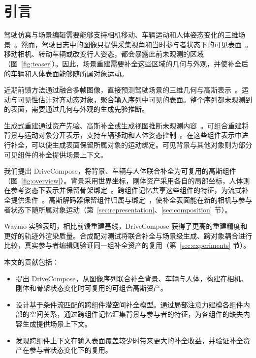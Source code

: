 \section{引言}
\label{sec:introduction}

驾驶仿真与场景编辑需要能够支持相机移动、车辆运动和人体姿态变化的三维场景~\cite{yang2023unisim,zhou2024hugsim}。然而，驾驶日志中的图像只提供采集视角和当时参与者状态下的可见表面~\cite{sun2020waymo,caesar2020nuscenes}。移动相机、转动车辆或改变行人姿态，都会暴露此前未观测的区域（图~\ref{fig:teaser}）。因此，场景重建需要补全这些区域的几何与外观，并使补全后的车辆和人体表面能够随所属对象运动。

近期前馈方法通过融合多帧图像，直接预测驾驶场景的三维几何与高斯表示~\cite{yang2025storm,chen2025dggt,yu2026streetforward,chi2026pointforward}。运动与可见性估计对齐动态对象，聚合输入序列中可见的表面。整个序列都未观测到的表面，需要通过几何与外观的生成先验推断。

生成式重建通过资产先验、高斯补全或生成视图推断未观测内容~\cite{yang2025genassets,liao2025complete,streetcrafter,zhu2025worldsplat}。可组合重建将背景与运动对象分开表示，支持车辆移动和人体姿态控制~\cite{yan2024street,chen2025omnire,zhou2024hugsim}。在这些组件表示中进行补全，可以使生成表面保留所属对象的运动绑定。可见背景与其他对象则为部分可见组件的补全提供场景上下文。

我们提出 DriveCompose，将背景、车辆与人体联合补全为可复用的高斯组件（图~\ref{fig:overview}）。背景采用世界坐标，刚体资产采用各自的局部坐标，人体则在参考姿态下表示并保留骨架绑定~\cite{yan2024street,chen2025omnire}。跨组件记忆共享这些组件的特征，为流式补全提供条件~\cite{lipman2022flowmatching}。高斯解码器保留组件归属与绑定~\cite{kerbl2023gaussians}，使补全表面能在新的相机与参与者状态下随所属对象运动（第~\ref{sec:representation}、\ref{sec:composition} 节）。

Waymo 实验表明，相比前馈重建基线，DriveCompose 获得了更高的重建精度和更好的轨迹外渲染质量。合成配对测试将联合补全与场景级生成、跨对象耦合进行比较，真实参与者编辑则验证同一组补全资产的复用（第~\ref{sec:experiments} 节）。

本文的贡献包括：
\begin{itemize}
\item 提出 DriveCompose，从图像序列联合补全背景、车辆与人体，构建在相机、刚体和骨架状态变化时可复用的可组合高斯资产。
\item 设计基于条件流匹配的跨组件潜空间补全模型。通过局部注意力建模各组件内部的空间关系，通过跨组件记忆汇集背景与参与者的特征，为各组件的缺失内容生成提供场景上下文。
\item 发现跨组件上下文在输入表面覆盖较少时带来更大的补全收益，并验证补全资产在参与者状态变化下的复用。
\end{itemize}
